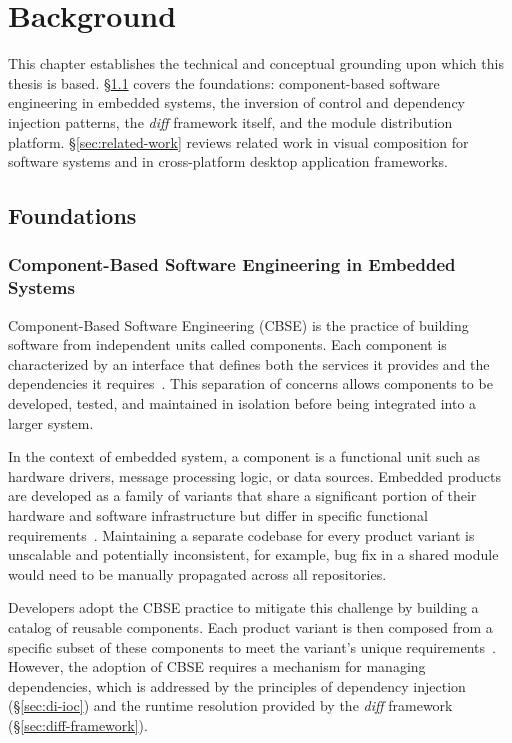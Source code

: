 \clearpage
\section{Background}

This chapter establishes the technical and conceptual grounding upon which this thesis is based. \S\ref{sec:foundations} covers the foundations: component-based software engineering in embedded systems, the inversion of control and dependency injection patterns, the \textit{diff} framework itself, and the module distribution platform. \S\ref{sec:related-work} reviews related work in visual composition for software systems and in cross-platform desktop application frameworks.

\subsection{Foundations}
\label{sec:foundations}

\subsubsection{Component-Based Software Engineering in Embedded Systems}

Component-Based Software Engineering (CBSE) is the practice of building software from independent units called components. Each component is characterized by an interface that defines both the services it provides and the dependencies it requires~\cite{szyperski2002}. This separation of concerns allows components to be developed, tested, and maintained in isolation before being integrated into a larger system.

In the context of embedded system, a component is a functional unit such as hardware drivers, message processing logic, or data sources. Embedded products are developed as a family of variants that share a significant portion of their hardware and software infrastructure but differ in specific functional requirements~\cite{clements2001spl}. Maintaining a separate codebase for every product variant is unscalable and potentially inconsistent, for example, bug fix in a shared module would need to be manually propagated across all repositories.

Developers adopt the CBSE practice to mitigate this challenge by building a catalog of reusable components. Each product variant is then composed from a specific subset of these components to meet the variant's unique requirements~\cite{crnkovic2002}. However, the adoption of CBSE requires a mechanism for managing dependencies, which is addressed by the principles of dependency injection (\S\ref{sec:di-ioc}) and the runtime resolution provided by the \textit{diff} framework (\S\ref{sec:diff-framework}).

